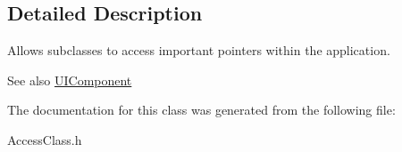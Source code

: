 \subsection{Detailed Description}
Allows subclasses to access important pointers within the application.

\begin{DoxySeeAlso}{See also}
\hyperlink{classUIComponent}{U\-I\-Component} 
\end{DoxySeeAlso}


The documentation for this class was generated from the following file\-:\begin{DoxyCompactItemize}
\item 
Access\-Class.\-h\end{DoxyCompactItemize}
